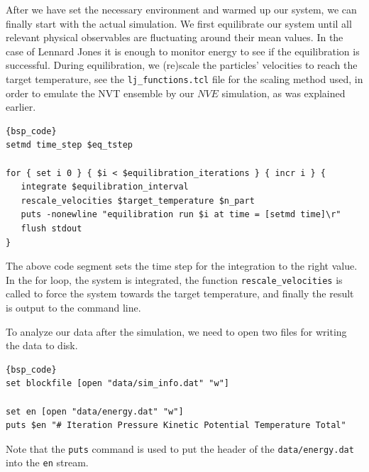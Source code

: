 \documentclass[
paper=a4,                       %
fontsize=11pt,                  %
twoside,                        %
footsepline,                    %
headsepline,                    %
headinclude=false,              %
footinclude=false,              %
pagesize,                       %
]{scrartcl}
\begin{document}
After we have set the necessary environment and warmed up our system, we can finally start with the actual simulation. We first equilibrate our system until all relevant physical observables are fluctuating around their mean values. In the case of Lennard Jones it is enough to monitor energy to see if the equilibration is successful. During equilibration, we (re)scale the particles' velocities to reach the target temperature, see the \texttt{lj\_functions.tcl} file for the scaling method used, in order to emulate the NVT ensemble by our $NVE$ simulation, as was explained earlier.

{\small\vspace{0,2cm}
\begin{lstlisting}[firstnumber=auto]{bsp_code}
setmd time_step $eq_tstep

for { set i 0 } { $i < $equilibration_iterations } { incr i } {
   integrate $equilibration_interval
   rescale_velocities $target_temperature $n_part
   puts -nonewline "equilibration run $i at time = [setmd time]\r"
   flush stdout
}
\end{lstlisting}\vspace{0,2cm}
}

\noindent The above code segment sets the time step for the integration to the right value. In the for loop, the system is integrated, the function \verb"rescale_velocities" is called to force the system towards the target temperature, and finally the result is output to the command line.

To analyze our data after the simulation, we need to open two files for writing the data to disk. 

{\small\vspace{0,2cm}
\begin{lstlisting}[firstnumber=auto]{bsp_code}
set blockfile [open "data/sim_info.dat" "w"]

set en [open "data/energy.dat" "w"]
puts $en "# Iteration Pressure Kinetic Potential Temperature Total"
\end{lstlisting}\vspace{0,2cm}
}

\noindent Note that the \verb"puts" command is used to put the header of the \texttt{data/energy.dat} into the \verb"en" stream. 
\end{document}
